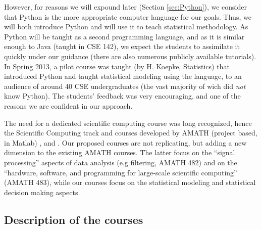 However, for reasons we will expound later (Section \ref{sec:Python}), we
consider that Python is the more appropriate computer language for our
goals. Thus, we will both introduce Python and will use it to teach
statistical methodology.  As Python will be taught as a second
programming language, and as it is similar enough to Java (taught in
CSE 142), we expect the students to assimilate it quickly under our
guidance (there are also numerous publicly available tutorials).
In Spring 2013, a pilot course was taught (by H. Koepke,
Statistics) that introduced Python and taught statistical modeling
using the language, to an audience of around 40 CSE undergraduates
(the vast majority of wich did {\em not} know Python). The students'
feedback was very encouraging, and one of the reasons we are confident
in our approach.

The need for a dedicated scientific computing course was long
recognized, hence the Scientific Computing track and courses developed
by AMATH {} (project based, in Matlab) {}, and {}. 
Our proposed courses are not replicating, but adding a new dimension to
the existing AMATH courses. The latter focus on the ``signal
processing'' aspects of data analysis (e.g filtering, {\sc AMATH
  482}) and on the ``hardware, software, and programming for
large-scale scientific computing'' ({\sc AMATH 483}), while our
courses focus on the statistical modeling and statistical decision
making aspects.
 

\subsection{Description of the courses}
\label{sec:course-descr}

